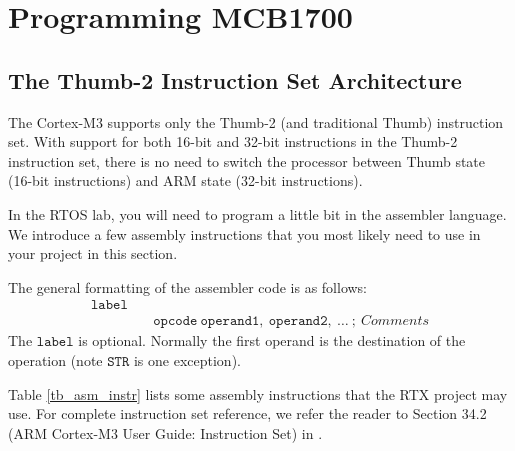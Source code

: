 \chapter{Programming MCB1700}
\section {The Thumb-2 Instruction Set Architecture}
The Cortex-M3 supports only the Thumb-2 (and traditional Thumb) instruction set.
With support for both 16-bit and 32-bit instructions in the Thumb-2 instruction
set, there is no need to switch the processor between Thumb state (16-bit instructions) and ARM state (32-bit instructions). 

In the RTOS lab, you will need to program a little bit in the assembler language. We introduce a few assembly instructions that you most likely need to use in your project in this section.

The general formatting of the assembler code is as follows:
\begin{eqnarray*}
    \mathtt{label} &~ &~ \\
     ~    & ~& \mathtt{opcode ~operand1, ~operand2,} ~\ldots~ ; ~  Comments
\end{eqnarray*}
The $\mathtt{label}$ is optional. Normally the first operand is the destination of the operation (note $\mathtt{STR}$ is one exception). 

Table \ref{tb_asm_instr} lists some assembly instructions that the RTX project may use. For complete instruction set reference, we refer the reader to Section 34.2 (ARM Cortex-M3 User Guide: Instruction Set) in \cite{nxp.lpc17xx.manual}.

